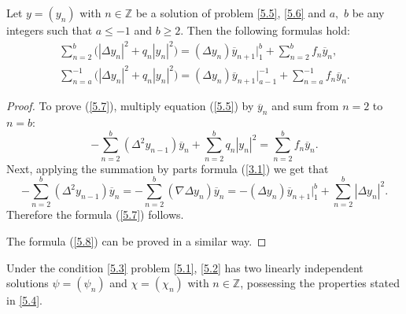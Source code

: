 \begin{lemma}
\label{Lem5.1}Let $y=(y_{n})$ with $n\in
\mathbb{Z}
$ be a solution of problem \eqref{5.5}, \eqref{5.6} and $a,$ $b$ be any
integers such that $a\leq -1$ and $b\geq 2$. Then the following formulas
hold:
\begin{gather}
\sum_{n=2}^{b}\big( \left\vert \Delta y_{n}\right\vert ^{2}+q_{n}\left\vert
y_{n}\right\vert ^{2}\big) =(\Delta y_{n})\overline{y}_{n+1}\big|
_{1}^{b}+\sum_{n=2}^{b}f_{n}\overline{y}_{n},  \label{5.7}
\\
\sum_{n=a}^{-1}\big( \left\vert \Delta y_{n}\right\vert
^{2}+q_{n}\left\vert y_{n}\right\vert ^{2}\big) =(\Delta y_{n})\overline{y}%
_{n+1}\big|_{a-1}^{-1}+\sum_{n=a}^{-1}f_{n}\overline{y}_{n}.  \label{5.8}
\end{gather}
\end{lemma}

\begin{proof}
To prove (\ref{5.7}), multiply equation (\ref{5.5}) by $\overline{y}_{n}$
and sum from $n=2$ to $n=b$:
\[
-\sum_{n=2}^{b}(\Delta ^{2}y_{n-1})\overline{y}_{n}+\sum_{n=2}^{b}q_{n}\left%
\vert y_{n}\right\vert ^{2}=\sum_{n=2}^{b}f_{n}\overline{y}_{n}.
\]%
Next, applying the summation by parts formula (\ref{3.1}) we get that%
\[
-\sum_{n=2}^{b}(\Delta ^{2}y_{n-1})\overline{y}_{n}=-\sum_{n=2}^{b}(\nabla
\Delta y_{n})\overline{y}_{n}=-(\Delta y_{n})\overline{y}_{n+1}\big|
_{1}^{b}+\sum_{n=2}^{b}\left\vert \Delta y_{n}\right\vert ^{2}.
\]%
Therefore the formula (\ref{5.7}) follows.

The formula (\ref{5.8}) can be proved in a similar way.
\end{proof}

\begin{theorem}
\label{Th5.2}Under the condition \eqref{5.3} problem \eqref{5.1}, \eqref{5.2} has two linearly independent solutions $\psi =(\psi _{n})$ and $\chi =(\chi
_{n})$ with $n\in
\mathbb{Z}
$, possessing the properties stated in \eqref{5.4}.
\end{theorem}

